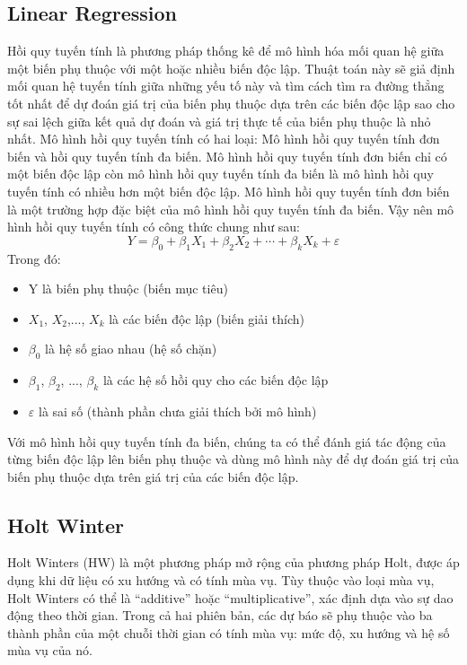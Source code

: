 \documentclass[conference]{IEEEtran}
\begin{document}
\subsection{Linear Regression}
Hồi quy tuyến tính là phương pháp thống kê để mô hình hóa mối quan hệ giữa một biến phụ thuộc với một hoặc nhiều biến độc lập. Thuật toán này sẽ giả định mối quan hệ tuyến tính giữa những yếu tố này và tìm cách tìm ra đường thẳng tốt nhất để dự đoán giá trị của biến phụ thuộc dựa trên các biến độc lập sao cho sự sai lệch giữa kết quả dự đoán và giá trị thực tế của biến phụ thuộc là nhỏ nhất. Mô hình hồi quy tuyến tính có hai loại: Mô hình hồi quy tuyến tính đơn biến và hồi quy tuyến tính đa biến. Mô hình hồi quy tuyến tính đơn biến chỉ có một biến độc lập còn mô hình hồi quy tuyến tính đa biến là mô hình hồi quy tuyến tính có nhiều hơn một biến độc lập. Mô hình hồi quy tuyến tính đơn biến là một trường hợp đặc biệt của mô hình hồi quy tuyến tính đa biến. Vậy nên mô hình hồi quy tuyến tính có công thức chung như sau:
\cite{linearRegressionMethod} 
\[Y=\beta_0+\beta_1X_1+\beta_2X_2+\cdots+\beta_kX_k+\varepsilon\]
Trong đó:
\begin{itemize}
    \item Y là biến phụ thuộc (biến mục tiêu)
    \item $X_1$, $X_2$,..., $X_k$ là các biến độc lập (biến giải thích)
    \item $\beta_0$ là hệ số giao nhau (hệ số chặn)
    \item $β_1$, $β_2$, ..., $β_k$ là các hệ số hồi quy cho các biến độc lập
    \item $\varepsilon$ là sai số (thành phần chưa giải thích bởi mô hình)
\end{itemize}
Với mô hình hồi quy tuyến tính đa biến, chúng ta có thể đánh giá tác động của từng biến độc lập lên biến phụ thuộc và dùng mô hình này để dự đoán giá trị của biến phụ thuộc dựa trên giá trị của các biến độc lập.

\subsection{Holt Winter}
Holt Winters (HW) là một phương pháp mở rộng của phương pháp Holt, được áp dụng khi dữ liệu có xu hướng và có tính mùa vụ. Tùy thuộc vào loại mùa vụ, Holt Winters có thể là “additive”  hoặc “multiplicative”, xác định dựa vào sự dao động theo thời gian. Trong cả hai phiên bản, các dự báo sẽ phụ thuộc vào ba thành phần của một chuỗi thời gian có tính mùa vụ: mức độ, xu hướng và hệ số mùa vụ của nó. \cite{HoltWinter1} 
\end{document}
